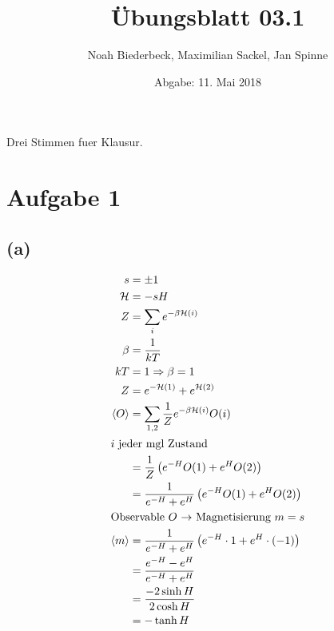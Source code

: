 \documentclass{scrartcl}
\title{Übungsblatt 03.1}
\author{%
  Noah Biederbeck, Maximilian Sackel, Jan Spinne
}
\date{Abgabe: 11. Mai 2018}
\begin{document}
\maketitle

Drei Stimmen fuer Klausur.

\section*{Aufgabe 1}
\subsection*{(a)}
\begin{align*}
  s &= \pm 1 \\
  \mathcal{H} &= -sH \\
  Z &= \sum_i e^{-\beta \mathcal{H}(i)} \\
  \beta &= \frac{1}{kT} \\
  kT &= 1 \Rightarrow \beta = 1 \\
  Z &= e^{-\mathcal{H}(1)} + e^{ \mathcal{H}(2) } \\
  \left<O\right> &= \sum_{1, 2} \frac{1}{Z} e^{-\beta \mathcal{H} (i)} O(i) \\
  \intertext{$i$ jeder mgl Zustand}
                 &= \frac{1}{Z} \left( e^{-H} O(1) + e^H  O(2) \right)\\
                 &= \frac{1}{e^{-H} + e^H} \left( e^{-H} O(1) + e^H  O(2) \right) \\
  \intertext{Observable $O$ $\rightarrow$ Magnetisierung $m = s$}
  \left<m\right> &= \frac{1}{e^{-H} + e^H} \left( e^{-H} \cdot 1 + e^H \cdot (-1) \right)\\
                 &= \frac{e^{-H} - e^H}{e^{-H} + e^H} \\
                 &= \frac{-2 \sinh{H}}{2 \cosh{H}} \\
                 &= -\tanh{H}
\end{align*}
\end{document}
